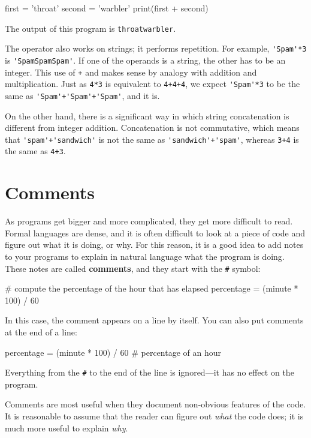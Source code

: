 
\beforeverb
\begin{pycode}
first = 'throat'
second = 'warbler'
print(first + second)
\end{pycode}
\afterverb
%
The output of this program is {\tt throatwarbler}.

The {\tt *} operator also works on strings; it performs repetition.
For example, \verb"'Spam'*3" is \verb"'SpamSpamSpam'".  If one of the operands
is a string, the other has to be an integer.
This use of {\tt +} and {\tt *} makes sense by
analogy with addition and multiplication.  Just as {\tt 4*3} is
equivalent to {\tt 4+4+4}, we expect \verb"'Spam'*3" to be the same as
\verb"'Spam'+'Spam'+'Spam'", and it is.  

On the other hand, there is a significant way in which string concatenation 
is different from integer addition. Concatenation is not commutative, which
 means that \verb"'spam'+'sandwich'" is not the same as \verb"'sandwich'+'spam'",
 whereas {\tt 3+4} is the same as {\tt 4+3}.



\section{Comments}

As programs get bigger and more complicated, they get more difficult
to read.  Formal languages are dense, and it is often difficult to
look at a piece of code and figure out what it is doing, or why.
For this reason, it is a good idea to add notes to your programs to explain
in natural language what the program is doing.  These notes are called
{\bf comments}, and they start with the \verb"#" symbol:

\beforeverb
\begin{pycode}
# compute the percentage of the hour that has elapsed
percentage = (minute * 100) / 60
\end{pycode}
\afterverb
%
In this case, the comment appears on a line by itself.  You can also put
comments at the end of a line:

\beforeverb
\begin{pycode}
percentage = (minute * 100) / 60     # percentage of an hour
\end{pycode}
\afterverb
%
Everything from the {\tt \#} to the end of the line is ignored---it
has no effect on the program.

Comments are most useful when they document non-obvious features of
the code.  It is reasonable to assume that the reader can figure out
{\em what} the code does; it is much more useful to explain {\em why}.

